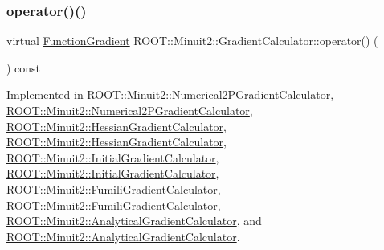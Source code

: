 \mbox{\label{classROOT_1_1Minuit2_1_1GradientCalculator_a1bae913e96ffc9ece28664a5f6f79cb0}} 
\subsubsection{\texorpdfstring{operator()()}{operator()()}\hspace{0.1cm}{\footnotesize\ttfamily [2/4]}}
{\footnotesize\ttfamily virtual \mbox{\hyperlink{classROOT_1_1Minuit2_1_1FunctionGradient}{Function\+Gradient}} R\+O\+O\+T\+::\+Minuit2\+::\+Gradient\+Calculator\+::operator() (\begin{DoxyParamCaption}\item[{const \mbox{\hyperlink{classROOT_1_1Minuit2_1_1MinimumParameters}{Minimum\+Parameters}} \&}]{ }\end{DoxyParamCaption}) const\hspace{0.3cm}{\ttfamily [pure virtual]}}



Implemented in \mbox{\hyperlink{classROOT_1_1Minuit2_1_1Numerical2PGradientCalculator_a40aca4ad0b9583062fc830c359140b43}{R\+O\+O\+T\+::\+Minuit2\+::\+Numerical2\+P\+Gradient\+Calculator}}, \mbox{\hyperlink{classROOT_1_1Minuit2_1_1Numerical2PGradientCalculator_a8c90cd467631ecc4cac72187de948b05}{R\+O\+O\+T\+::\+Minuit2\+::\+Numerical2\+P\+Gradient\+Calculator}}, \mbox{\hyperlink{classROOT_1_1Minuit2_1_1HessianGradientCalculator_ada968380aae7c1c6b6d0716d6a9804b5}{R\+O\+O\+T\+::\+Minuit2\+::\+Hessian\+Gradient\+Calculator}}, \mbox{\hyperlink{classROOT_1_1Minuit2_1_1HessianGradientCalculator_af65e43d99c763df00e3d082d59a7a24d}{R\+O\+O\+T\+::\+Minuit2\+::\+Hessian\+Gradient\+Calculator}}, \mbox{\hyperlink{classROOT_1_1Minuit2_1_1InitialGradientCalculator_afae3b02315c3ed44cdd94dff4bd53462}{R\+O\+O\+T\+::\+Minuit2\+::\+Initial\+Gradient\+Calculator}}, \mbox{\hyperlink{classROOT_1_1Minuit2_1_1InitialGradientCalculator_ae3f248b2e9e40bc62ee7dc68c8ee010f}{R\+O\+O\+T\+::\+Minuit2\+::\+Initial\+Gradient\+Calculator}}, \mbox{\hyperlink{classROOT_1_1Minuit2_1_1FumiliGradientCalculator_a23fd61bceabbf88e66c5abe6b2815331}{R\+O\+O\+T\+::\+Minuit2\+::\+Fumili\+Gradient\+Calculator}}, \mbox{\hyperlink{classROOT_1_1Minuit2_1_1FumiliGradientCalculator_a23fd61bceabbf88e66c5abe6b2815331}{R\+O\+O\+T\+::\+Minuit2\+::\+Fumili\+Gradient\+Calculator}}, \mbox{\hyperlink{classROOT_1_1Minuit2_1_1AnalyticalGradientCalculator_aff4787568d15aaf6dac1c8ffa1bd9db7}{R\+O\+O\+T\+::\+Minuit2\+::\+Analytical\+Gradient\+Calculator}}, and \mbox{\hyperlink{classROOT_1_1Minuit2_1_1AnalyticalGradientCalculator_a711ef74b01726ca7081031998c44d81b}{R\+O\+O\+T\+::\+Minuit2\+::\+Analytical\+Gradient\+Calculator}}.


